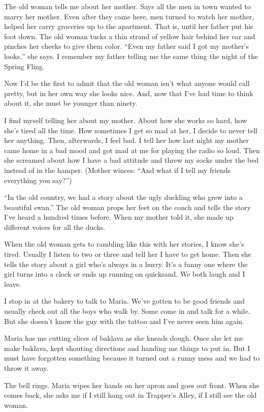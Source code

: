 \documentclass[twoside,10pt]{book}
\begin{document}
The old woman tells me about her mother. Says all the men in town wanted
to marry her mother. Even after they came here, men turned to watch her
mother, helped her carry groceries up to the apartment. That is, until
her father put his foot down. The old woman tucks a thin strand of
yellow hair behind her ear and pinches her cheeks to give them color.
``Even my father said I got my mother's looks,'' she says. I remember my
father telling me the same thing the night of the Spring Fling.

Now I'd be the first to admit that the old woman isn't what anyone would
call pretty, but in her own way she looks nice. And, now that I've had
time to think about it, she must be younger than ninety.

I find myself telling her about my mother. About how she works so hard,
how she's tired all the time. How sometimes I get so mad at her, I
decide to never tell her anything. Then, afterwards, I feel bad. I tell
her how last night my mother came home in a bad mood and got mad at me
for playing the radio so loud. Then she screamed about how I have a bad
attitude and threw my socks under the bed instead of in the hamper.
(Mother winces: ``And what if I tell my friends everything you say?'')

``In the old country, we had a story about the ugly duckling who grew
into a beautiful swan.'' The old woman props her feet on the couch and
tells the story I've heard a hundred times before. When my mother told
it, she made up different voices for all the ducks.

When the old woman gets to rambling like this with her stories, I know
she's tired. Usually I listen to two or three and tell her I have to get
home. Then she tells the story about a girl who's always in a hurry.
It's a funny one where the girl turns into a clock or ends up running on
quicksand. We both laugh and I leave.

I stop in at the bakery to talk to Maria. We've gotten to be good
friends and usually check out all the boys who walk by. Some come in and
talk for a while. But she doesn't know the guy with the tattoo and I've
never seen him again.

Maria has me cutting slices of baklava as she kneads dough. Once she let
me make baklava, kept shouting directions and handing me things to put
in. But I must have forgotten something because it turned out a runny
mess and we had to throw it away.

The bell rings. Maria wipes her hands on her apron and goes out front.
When she comes back, she asks me if I still hang out in Trapper's Alley,
if I still see the old woman.
\end{document}
